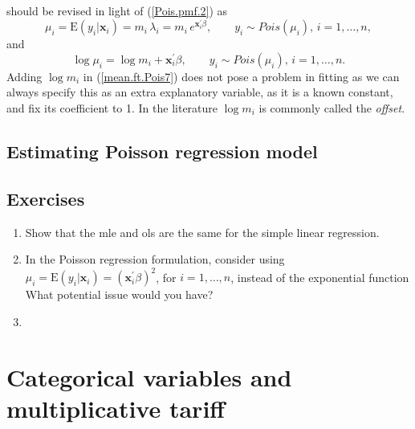 \documentclass[12pt]{article}
\def\E{\mathrm{E}}
\begin{document}
should be revised in light of (\ref{Pois.pmf.2}) as
\begin{equation}
\label{mean.ft.Pois6}
\mu_i=\E(y_i|\mathbf{ x}_i)=m_i \,\lambda_i=m_i \, e^{\mathbf{ x}^{\prime}_i\beta}, \qquad y_i \sim Pois(\mu_i), \, i=1, \ldots, n,
\end{equation} 
 and 
\begin{equation}
\label{mean.ft.Pois7}
\log \mu_i=\log m_i+\mathbf{ x}^{\prime}_i\beta, \qquad y_i \sim Pois(\mu_i), \, i=1, \ldots, n.
\end{equation}
Adding $\log m_i$ in (\ref{mean.ft.Pois7}) does not pose a problem in fitting as we can always specify this as an extra explanatory variable, as it is a known constant, and fix its coefficient to 1. In the literature $\log m_i$ is commonly called the \textit{offset}.

\subsection{Estimating Poisson regression model}

\subsection{Exercises}
\begin{enumerate}
  \item Show that the mle and ols are the same for the simple linear regression.  
  \item In the Poisson regression formulation, consider using $\mu_i=\E(y_i|\mathbf{ x}_i)=({\mathbf{ x}^{\prime}_i\beta})^2$, for  $i=1, \ldots, n$,  instead of the exponential function  What potential issue would you have?
  \item 
\end{enumerate}
\section{Categorical variables and multiplicative tariff}
\end{document}
